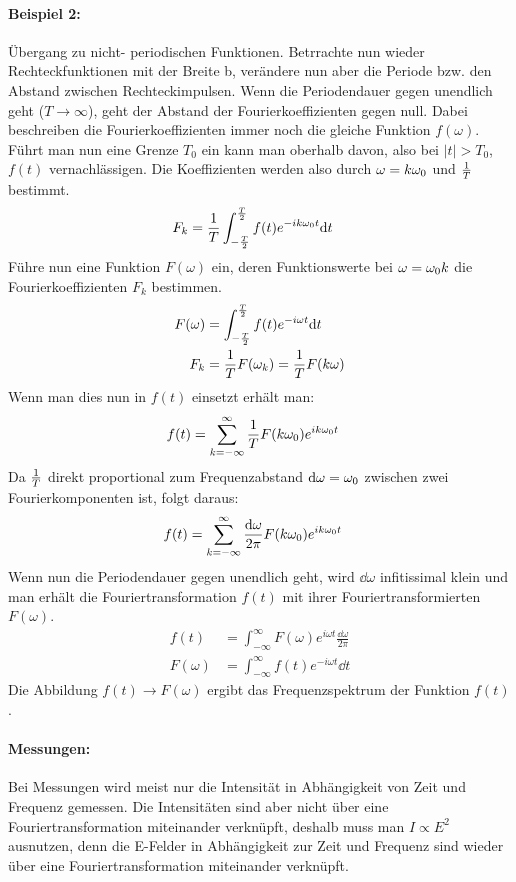 \paragraph{Beispiel 2:}Übergang zu nicht- periodischen Funktionen. Betrrachte nun wieder Rechteckfunktionen mit der Breite b, verändere nun aber die Periode bzw. den Abstand zwischen Rechteckimpulsen.
Wenn die Periodendauer gegen unendlich geht ($T\longrightarrow\infty$), geht der Abstand der Fourierkoeffizienten gegen null. Dabei beschreiben die Fourierkoeffizienten immer noch die gleiche Funktion $f(\omega)$. Führt man nun eine Grenze $T_0$ ein kann man oberhalb davon, also bei $\vert t\vert >T_0$, $f(t)$ vernachlässigen. Die Koeffizienten werden also durch $\omega=k\omega_0$ und $\frac{1}{T}$ bestimmt.
\begin{align*}
	F_k&=\frac{1}{T} \int_{-\frac{T}{2}}^{\frac{T}{2}} f(t) e^{-ik\omega_0 t}\mathrm{d} t
\end{align*}
Führe nun eine Funktion $F(\omega)$ ein, deren Funktionswerte bei $\omega=\omega_0 k$ die Fourierkoeffizienten $F_k$ bestimmen.
\begin{align*}
	F(\omega)&=\int_{-\frac{T}{2}}^{\frac{T}{2}}f(t)e^{-i\omega t}\mathrm{d} t\\
	F_k&=\frac{1}{T}F(\omega_k)=\frac{1}{T}F(k\omega)
\end{align*}
Wenn man dies nun in $f(t)$ einsetzt erhält man:
\begin{align*}
	f(t)&=\sum_{k=-\infty}^{\infty}\frac{1}{T} F(k\omega_0)e^{ik\omega_0 t}
\end{align*}
Da $\frac{1}{T}$ direkt proportional zum Frequenzabstand $\mathrm{d}\omega =\omega_0$ zwischen zwei Fourierkomponenten ist, folgt daraus:
\begin{align*}
	f(t)&=\sum_{k=-\infty}^{\infty}\frac{\mathrm{d} \omega}{2\pi} F(k\omega_0)e^{ik\omega_0 t}
\end{align*}
Wenn nun die Periodendauer gegen unendlich geht, wird $\dd \omega$ infitissimal klein und man erhält die Fouriertransformation $f(t)$ mit ihrer Fouriertransformierten $F(\omega)$.
\begin{align*}
	f(t)&=\int_{-\infty}^{\infty} F(\omega)e^{i\omega t}\frac{\dd\omega}{2\pi}\\
	F(\omega)&=\int_{-\infty}^{\infty} f(t)e^{-i\omega t}\dd t
\end{align*}
Die Abbildung $f(t)\longrightarrow F(\omega)$ ergibt das Frequenzspektrum der Funktion $f(t)$.
\paragraph{Messungen:} Bei Messungen wird meist nur die Intensität in Abhängigkeit von Zeit und Frequenz gemessen. Die Intensitäten sind aber nicht über eine Fouriertransformation miteinander verknüpft, deshalb muss man $I\propto E^2$ ausnutzen, denn die E-Felder in Abhängigkeit zur Zeit und Frequenz sind wieder über eine Fouriertransformation miteinander verknüpft.

